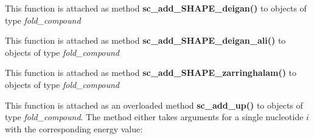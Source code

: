 \begin{DoxyRefList}
\item[Global \mbox{\hyperlink{group__SHAPE__reactivities_ga57d612b58e1c61dd6cfcb5a843f8f1b3}{vrna\+\_\+sc\+\_\+add\+\_\+\+S\+H\+A\+P\+E\+\_\+deigan}} (vrna\+\_\+fold\+\_\+compound\+\_\+t $\ast$vc, const double $\ast$reactivities, double m, double b, unsigned int options)]\label{wrappers__wrappers000030}%
%
 This function is attached as method {\bfseries{sc\+\_\+add\+\_\+\+S\+H\+A\+P\+E\+\_\+deigan()}} to objects of type {\itshape fold\+\_\+compound}  
\item[Global \mbox{\hyperlink{group__SHAPE__reactivities_ga04ba85da63d8c793bb8001d1e6f800ba}{vrna\+\_\+sc\+\_\+add\+\_\+\+S\+H\+A\+P\+E\+\_\+deigan\+\_\+ali}} (vrna\+\_\+fold\+\_\+compound\+\_\+t $\ast$vc, const char $\ast$$\ast$shape\+\_\+files, const int $\ast$shape\+\_\+file\+\_\+association, double m, double b, unsigned int options)]\label{wrappers__wrappers000031}%
%
 This function is attached as method {\bfseries{sc\+\_\+add\+\_\+\+S\+H\+A\+P\+E\+\_\+deigan\+\_\+ali()}} to objects of type {\itshape fold\+\_\+compound}  
\item[Global \mbox{\hyperlink{group__SHAPE__reactivities_gaf3c65a045060aef5c4e41693d30af58c}{vrna\+\_\+sc\+\_\+add\+\_\+\+S\+H\+A\+P\+E\+\_\+zarringhalam}} (vrna\+\_\+fold\+\_\+compound\+\_\+t $\ast$vc, const double $\ast$reactivities, double b, double default\+\_\+value, const char $\ast$shape\+\_\+conversion, unsigned int options)]\label{wrappers__wrappers000032}%
%
 This function is attached as method {\bfseries{sc\+\_\+add\+\_\+\+S\+H\+A\+P\+E\+\_\+zarringhalam()}} to objects of type {\itshape fold\+\_\+compound}  
\item[Global \mbox{\hyperlink{group__soft__constraints_ga069915fe203a2c8e522dd37847177a09}{vrna\+\_\+sc\+\_\+add\+\_\+up}} (vrna\+\_\+fold\+\_\+compound\+\_\+t $\ast$vc, int i, F\+L\+T\+\_\+\+O\+R\+\_\+\+D\+BL energy, unsigned int options)]\label{wrappers__wrappers000038}%
%
 This function is attached as an overloaded method {\bfseries{sc\+\_\+add\+\_\+up()}} to objects of type {\itshape fold\+\_\+compound}. The method either takes arguments for a single nucleotide $i $ with the corresponding energy value\+:  
\item[Global \mbox{\hyperlink{group__soft__constraints_ga9d977a1681356778cc66dceafbe5b032}{vrna\+\_\+sc\+\_\+init}} (vrna\+\_\+fold\+\_\+compound\+\_\+t $\ast$vc)]\label{wrappers__wrappers000033}%
%
$$
\end{DoxyRefList}
